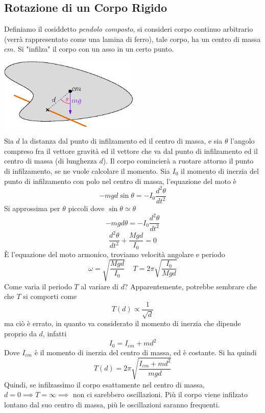 \documentclass[10pt, letterpaper]{report}
\begin{document}
\subsection{Rotazione di un Corpo Rigido}
Definiamo il cosiddetto \textit{pendolo composto}, si consideri corpo continuo arbitrario (verrà rappresentato 
come una lamina di ferro), tale corpo, ha un centro di massa $cm$. Si "infilza" il corpo con un asso in un 
certo punto.\begin{center}
    \includegraphics[width=0.5\textwidth ]{images/pendoloComposto.eps}
\end{center}
Sia $d$ la distanza dal punto di infilzamento ed il centro di massa, e sia $\theta$ l'angolo compreso fra il vettore gravità ed il vettore che va dal punto di infilzamento ed il centro di massa (di lunghezza $d$). Il corpo comincierà a ruotare attorno il punto di infilzamento, se ne vuole calcolare il momento. 
Sia $I_0$ il momento di inerzia del punto di infilzamento con polo nel centro di massa, l'equazione del moto 
è 
$$-mgd\sin\theta=-I_0\dfrac{d^2\theta}{dt^2}$$
Si approssima per $\theta$ piccoli dove $\sin\theta\simeq \theta$
$$ -mgd\theta=-I_0\dfrac{d^2\theta}{dt^2}$$
$$\dfrac{d^2\theta}{dt^2}+\frac{Mgd}{I_0}=0$$
È l'equazione del moto armonico, troviamo velocità angolare e periodo 
$$\omega = \sqrt{\frac{Mgd}{I_0}}  \ \ \ \ \ T=2\pi\sqrt{\frac{I_0}{Mgd}}$$
Come varia il periodo $T$ al variare di $d$? Apparentemente, potrebbe sembrare che che $T$ si comporti come 
$$ T(d)\propto \frac{1}{\sqrt{d}}$$
ma ciò è errato, in quanto va considerato il momento di inerzia che dipende proprio da $d$, infatti 
$$ I_0=I_{cm}+md^2$$
Dove $I_{cm}$ è il momento di inerzia del centro di massa, ed è costante. Si ha quindi 
$$ T(d)=2\pi\sqrt{\frac{I_{cm}+md^2}{mgd}}$$
Quindi, se infilzassimo il corpo esattamente nel centro di massa, $d=0\implies T=\infty \implies$ non ci sarebbero oscillazioni. Più il corpo viene infilzato lontano dal suo centro di massa, più le oscillazioni 
saranno frequenti.\begin{center}
\end{center}
\flowerLine
\end{document}
